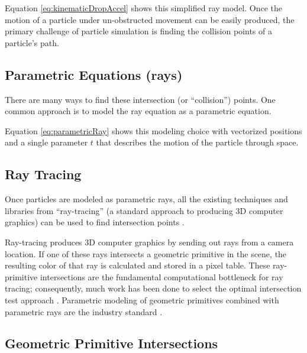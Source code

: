 Equation \eqref{eq:kinematicDropAccel} shows this simplified ray model. Once the motion of a particle under un-obstructed movement can be easily produced, the primary challenge of particle simulation is finding the collision points of a particle's path.

	\subsection{Parametric Equations (rays)}

There are many ways to find these intersection (or ``collision'') points. One common approach is to model the ray equation as a parametric equation.


 {
	\label{eq:parametricRay}
}

Equation \eqref{eq:parametricRay} shows this modeling choice with vectorized positions and a single parameter $t$ that describes the motion of the particle through space.


	\subsection{Ray Tracing}

Once particles are modeled as parametric rays, all the existing techniques and libraries from ``ray-tracing'' (a standard approach to producing 3D computer graphics) can be used to find intersection points \cite{purcell2002ray}.

Ray-tracing produces 3D computer graphics by sending out rays from a camera location. If one of these rays intersects a geometric primitive in the scene, the resulting color of that ray is calculated and stored in a pixel table. These ray-primitive intersections are the fundamental computational bottleneck for ray tracing; consequently, much work has been done to select the optimal intersection test approach \cite{purcell2002ray}. Parametric modeling of geometric primitives combined with parametric rays are the industry standard \cite{glassner1989introduction}.

	\subsection{Geometric Primitive Intersections}

